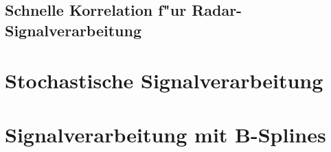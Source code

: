 \subsection{Schnelle Korrelation f"ur Radar-Signalverarbeitung}\label{sec:mseq}
%

%
%
%
\section{Stochastische Signalverarbeitung}\label{sec:random}

%
%
\section{Signalverarbeitung mit B-Splines}\label{sec:bsplines}
%

%
%
%
\ENDDOCUMENT
